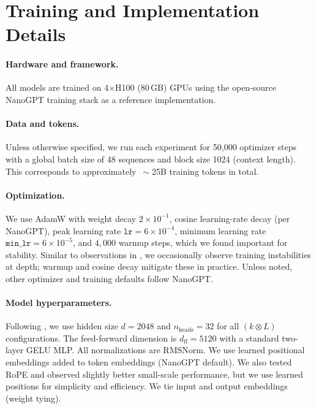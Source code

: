 


\section{Training and Implementation Details}
\label{sec:supp_exp_details}

\paragraph{Hardware and framework.}
All models are trained on 4$\times$H100 (80\,GB) GPUs using the open-source NanoGPT training stack as a reference implementation.

\paragraph{Data and tokens.}
Unless otherwise specified, we run each experiment for 50{,}000 optimizer steps with a global batch size of 48 sequences and block size 1024 (context length). This corresponds to approximately $\,\sim$25B training tokens in total.

\paragraph{Optimization.}
We use AdamW with weight decay $2\times 10^{-1}$, cosine learning-rate decay (per NanoGPT), peak learning rate $\texttt{lr}=6\times 10^{-4}$, minimum learning rate $\texttt{min\_lr}=6\times 10^{-5}$, and $4{,}000$ warmup steps, which we found important for stability. Similar to observations in \cite{geiping2025scaling}, we occasionally observe training instabilities at depth; warmup and cosine decay mitigate these in practice. Unless noted, other optimizer and training defaults follow NanoGPT.

\paragraph{Model hyperparameters.}
Following \cite{saunshi2025reasoning}, we use hidden size $d=2048$ and $n_{\text{heads}}=32$ for all $(k\otimes L)$ configurations. The feed-forward dimension is $d_{\text{ff}}=5120$ with a standard two-layer GELU MLP. All normalizations are RMSNorm. We use learned positional embeddings added to token embeddings (NanoGPT default). We also tested RoPE \cite{su2024roformer} and observed slightly better small-scale performance, but we use learned positions for simplicity and efficiency. We tie input and output embeddings (weight tying).

